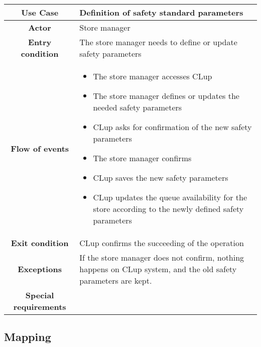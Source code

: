 \documentclass[../../main.tex]{subfiles}
\begin{document}
      \begin{table}[H]
        \centering
          \begin{tabular}{c m{}}
          \hline
          \textbf{Use Case} & Definition of safety standard parameters\\ \hline
          \textbf{Actor} & Store manager\\ \hline
          \textbf{Entry condition} & The store manager needs to define or update safety parameters \\  \hline
          \textbf{Flow of events} & \begin{itemize}
                                      \item The store manager accesses CLup
                                      \item The store manager defines or updates the needed safety parameters
                                      \item CLup asks for confirmation of the new safety parameters
                                      \item The store manager confirms
                                      \item CLup saves the new safety parameters
                                      \item CLup updates the queue availability for the store according to the newly defined safety parameters
                                    \end{itemize}\\ \hline
          \textbf{Exit condition} & CLup confirms the succeeding of the operation \\ \hline
          \textbf{Exceptions} & If the store manager does not confirm, nothing happens on CLup system, and the old safety parameters are kept.\\ \hline
          \textbf{Special requirements} &\\ \hline
          \end{tabular}
      \end{table}


    \subsection{Mapping}
    
\end{document}

